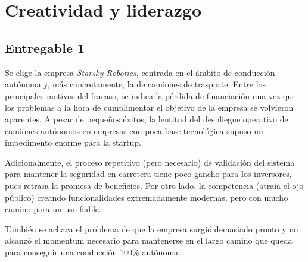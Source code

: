 \section{Creatividad y liderazgo}


\subsection{Entregable 1}

Se elige la empresa \textit{Starsky Robotics}, centrada en el ámbito de conducción autónoma y, más concretamente, la de camiones de trasporte. Entre los principales motivos del fracaso, se indica la pérdida de financiación una vez que los problemas a la hora de cumplimentar el objetivo de la empresa se volvieron aparentes. A pesar de pequeños éxitos, la lentitud del despliegue operativo de camiones autónomos en empresas con poca base tecnológica supuso un impedimento enorme para la startup.

\vspace{\baselineskip}

Adicionalmente, el proceso repetitivo (pero necesario) de validación del sistema para mantener la seguridad en carretera tiene poco gancho para los inversores, pues retrasa la promesa de beneficios. Por otro lado, la competencia (atraía el ojo público) creando funcionalidades extremadamente modernas, pero con mucho camino para un uso fiable.

\vspace{\baselineskip}

También se achaca el problema de que la empresa surgió demasiado pronto y no alcanzó el momentum necesario para mantenerse en el largo camino que queda para conseguir una conducción 100\% autónoma.


